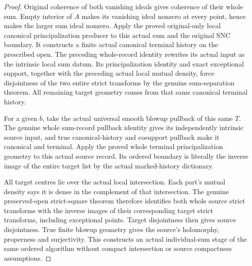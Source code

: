 \begin{proof}
Original coherence of both vanishing ideals gives coherence of their
whole sum. Empty interior of $A$ makes its vanishing ideal nonzero at
every point, hence makes the larger sum ideal nonzero. Apply the
proved original-only local canonical principalization producer to
this actual sum and the original SNC boundary. It constructs a
finite actual canonical terminal history on the prescribed open.
The preceding whole-record identity rewrites its actual input as the
intrinsic local sum datum. Its principalization identity and exact
exceptional support, together with the preceding actual local mutual
density, force disjointness of the two entire strict transforms by
the genuine sum-separation theorem. All remaining target geometry
comes from that same canonical terminal history.

For a given $b$, take the actual universal smooth blowup pullback of
this same $T$. The genuine whole sum-record pullback identity gives
its independently intrinsic source input, and true canonical-history
and cosupport pullback make it canonical and terminal. Apply the
proved whole terminal principalization geometry to this actual source
record. Its ordered boundary is literally the inverse image of the
entire target list by the actual marked-history dictionary.

All target centres lie over the actual local intersection. Each
part's mutual density says it is dense in the complement of that
intersection. The genuine preserved-open strict-square theorem
therefore identifies both whole source strict transforms with the
inverse images of their corresponding target strict transforms,
including exceptional points. Target disjointness then gives source
disjointness. True finite blowup geometry gives the source's
holomorphy, properness and surjectivity. This constructs an actual
individual-sum stage of the same ordered algorithm without compact
intersection or source compactness assumptions.
\end{proof}
